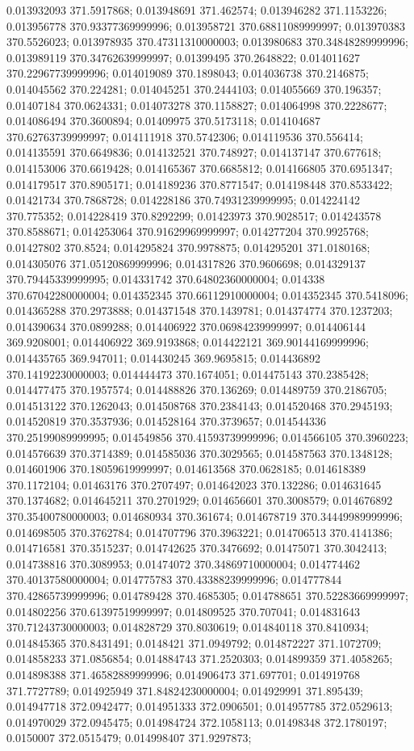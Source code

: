 0.013932093 371.5917868; 0.013948691 371.462574; 0.013946282 371.1153226; 0.013956778 370.93377369999996; 0.013958721 370.68811089999997; 0.013970383 370.5526023; 0.013978935 370.47311310000003; 0.013980683 370.34848289999996; 0.013989119 370.34762639999997; 0.01399495 370.2648822; 0.014011627 370.22967739999996; 0.014019089 370.1898043; 0.014036738 370.2146875; 0.014045562 370.224281; 0.014045251 370.2444103; 0.014055669 370.196357; 0.01407184 370.0624331; 0.014073278 370.1158827; 0.014064998 370.2228677; 0.014086494 370.3600894; 0.01409975 370.5173118; 0.014104687 370.62763739999997; 0.014111918 370.5742306; 0.014119536 370.556414; 0.014135591 370.6649836; 0.014132521 370.748927; 0.014137147 370.677618; 0.014153006 370.6619428; 0.014165367 370.6685812; 0.014166805 370.6951347; 0.014179517 370.8905171; 0.014189236 370.8771547; 0.014198448 370.8533422; 0.01421734 370.7868728; 0.014228186 370.74931239999995; 0.014224142 370.775352; 0.014228419 370.8292299; 0.01423973 370.9028517; 0.014243578 370.8588671; 0.014253064 370.91629969999997; 0.014277204 370.9925768; 0.01427802 370.8524; 0.014295824 370.9978875; 0.014295201 371.0180168; 0.014305076 371.05120869999996; 0.014317826 370.9606698; 0.014329137 370.79445339999995; 0.014331742 370.64802360000004; 0.014338 370.67042280000004; 0.014352345 370.66112910000004; 0.014352345 370.5418096; 0.014365288 370.2973888; 0.014371548 370.1439781; 0.014374774 370.1237203; 0.014390634 370.0899288; 0.014406922 370.06984239999997; 0.014406144 369.9208001; 0.014406922 369.9193868; 0.014422121 369.90144169999996; 0.014435765 369.947011; 0.014430245 369.9695815; 0.014436892 370.14192230000003; 0.014444473 370.1674051; 0.014475143 370.2385428; 0.014477475 370.1957574; 0.014488826 370.136269; 0.014489759 370.2186705; 0.014513122 370.1262043; 0.014508768 370.2384143; 0.014520468 370.2945193; 0.014520819 370.3537936; 0.014528164 370.3739657; 0.014544336 370.25199089999995; 0.014549856 370.41593739999996; 0.014566105 370.3960223; 0.014576639 370.3714389; 0.014585036 370.3029565; 0.014587563 370.1348128; 0.014601906 370.18059619999997; 0.014613568 370.0628185; 0.014618389 370.1172104; 0.01463176 370.2707497; 0.014642023 370.132286; 0.014631645 370.1374682; 0.014645211 370.2701929; 0.014656601 370.3008579; 0.014676892 370.35400780000003; 0.014680934 370.361674; 0.014678719 370.34449989999996; 0.014698505 370.3762784; 0.014707796 370.3963221; 0.014706513 370.4141386; 0.014716581 370.3515237; 0.014742625 370.3476692; 0.01475071 370.3042413; 0.014738816 370.3089953; 0.01474072 370.34869710000004; 0.014774462 370.40137580000004; 0.014775783 370.43388239999996; 0.014777844 370.42865739999996; 0.014789428 370.4685305; 0.014788651 370.52283669999997; 0.014802256 370.61397519999997; 0.014809525 370.707041; 0.014831643 370.71243730000003; 0.014828729 370.8030619; 0.014840118 370.8410934; 0.014845365 370.8431491; 0.0148421 371.0949792; 0.014872227 371.1072709; 0.014858233 371.0856854; 0.014884743 371.2520303; 0.014899359 371.4058265; 0.014898388 371.46582889999996; 0.014906473 371.697701; 0.014919768 371.7727789; 0.014925949 371.84824230000004; 0.014929991 371.895439; 0.014947718 372.0942477; 0.014951333 372.0906501; 0.014957785 372.0529613; 0.014970029 372.0945475; 0.014984724 372.1058113; 0.01498348 372.1780197; 0.0150007 372.0515479; 0.014998407 371.9297873; 